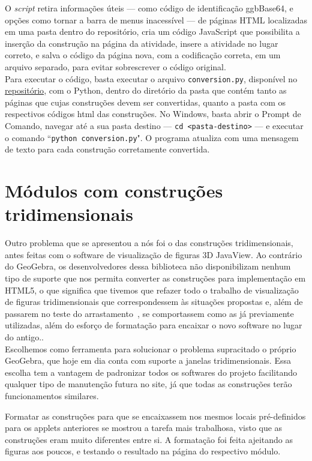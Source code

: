 O \textit{script} retira informações úteis --- como código de identificação ggbBase64, e opções como tornar a barra de menus inacessível --- de páginas HTML localizadas em uma pasta dentro do repositório, cria um código JavaScript que possibilita a inserção da construção na página da atividade, insere a atividade no lugar correto, e salva o código da página nova, com a codificação correta, em um arquivo separado, para evitar sobrescrever o código original.
\\

Para executar o código, basta executar o arquivo \texttt{conversion.py}, disponível no \href{https://github.com/fellipessanha/CDME-javascript/}{repositório}, com o Python, dentro do diretório da pasta que contém tanto as páginas que cujas construções devem ser convertidas, quanto a pasta com os respectivos códigos html das construções. No Windows, basta abrir o Prompt de Comando, navegar até a sua pasta destino --- \texttt{cd <pasta-destino>} --- e executar o comando ``\texttt{python conversion.py}". O programa atualiza com uma mensagem de texto para cada construção corretamente convertida.


\section{Módulos com construções tridimensionais}

Outro problema que se apresentou a nós foi o das construções tridimensionais, antes feitas com o software de visualização de figuras 3D JavaView. Ao contrário do GeoGebra, os desenvolvedores dessa biblioteca não disponibilizam nenhum tipo de suporte que nos permita converter as construções para implementação em HTML5, o que significa que tivemos que refazer todo o trabalho de visualização de figuras tridimensionais que correspondessem às situações propostas e, além de passarem no teste do arrastamento~\cite{de2020fases}, se comportassem como as já previamente utilizadas, além do esforço de formatação para encaixar o novo software no lugar do antigo..
\\

Escolhemos como ferramenta para solucionar o problema supracitado o próprio GeoGebra, que hoje em dia conta com suporte a janelas tridimensionais. Essa escolha tem a vantagem de padronizar todos os softwares do projeto facilitando qualquer tipo de manutenção futura no site, já que todas as construções terão funcionamentos similares.

Formatar as construções para que se encaixassem nos mesmos locais pré-definidos para os applets anteriores se mostrou a tarefa mais trabalhosa, visto que as construções eram muito diferentes entre si. A formatação foi feita ajeitando as figuras aos poucos, e testando o resultado na página do respectivo módulo.
\\

